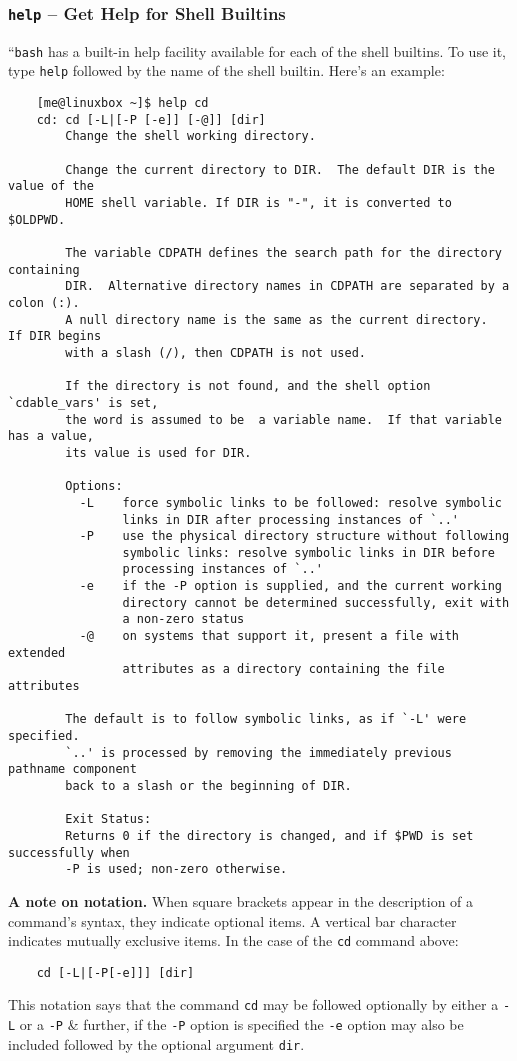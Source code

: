 \documentclass[oneside]{book}
\numberwithin{equation}{section}
\begin{document}
\subsubsection{\texttt{help} -- Get Help for Shell Builtins}
``\texttt{bash} has a built-in help facility available for each of the shell builtins. To use it, type \texttt{help} followed by the name of the shell builtin. Here's an example:
\begin{verbatim}
	[me@linuxbox ~]$ help cd
	cd: cd [-L|[-P [-e]] [-@]] [dir]
	    Change the shell working directory.
	    
	    Change the current directory to DIR.  The default DIR is the value of the
	    HOME shell variable. If DIR is "-", it is converted to $OLDPWD.
	    
	    The variable CDPATH defines the search path for the directory containing
	    DIR.  Alternative directory names in CDPATH are separated by a colon (:).
	    A null directory name is the same as the current directory.  If DIR begins
	    with a slash (/), then CDPATH is not used.
	    
	    If the directory is not found, and the shell option `cdable_vars' is set,
	    the word is assumed to be  a variable name.  If that variable has a value,
	    its value is used for DIR.
	    
	    Options:
	      -L	force symbolic links to be followed: resolve symbolic
	    		links in DIR after processing instances of `..'
	      -P	use the physical directory structure without following
	    		symbolic links: resolve symbolic links in DIR before
	    		processing instances of `..'
	      -e	if the -P option is supplied, and the current working
	    		directory cannot be determined successfully, exit with
	    		a non-zero status
	      -@	on systems that support it, present a file with extended
	    		attributes as a directory containing the file attributes
	    
	    The default is to follow symbolic links, as if `-L' were specified.
	    `..' is processed by removing the immediately previous pathname component
	    back to a slash or the beginning of DIR.
	    
	    Exit Status:
	    Returns 0 if the directory is changed, and if $PWD is set successfully when
	    -P is used; non-zero otherwise.
\end{verbatim}
\textbf{A note on notation.} When square brackets appear in the description of a command's syntax, they indicate optional items. A vertical bar character indicates mutually exclusive items. In the case of the \texttt{cd} command above:
\begin{verbatim}
    cd [-L|[-P[-e]]] [dir]
\end{verbatim}
This notation says that the command \texttt{cd} may be followed optionally by either a \texttt{-L} or a \texttt{-P} \& further, if the \texttt{-P} option is specified the \texttt{-e} option may also be included followed by the optional argument \texttt{dir}.
\end{document}
